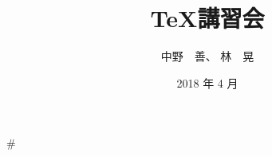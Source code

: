 \documentclass[a4paper, 11pt,fleqn]{jarticle}               %
\begin{document}

\title{\TeX 講習会}
\date{2018 年 4 月}
\author{中野　善、 林　晃}
\maketitle

\tableofcontents

\newpage




#
\end{document}
